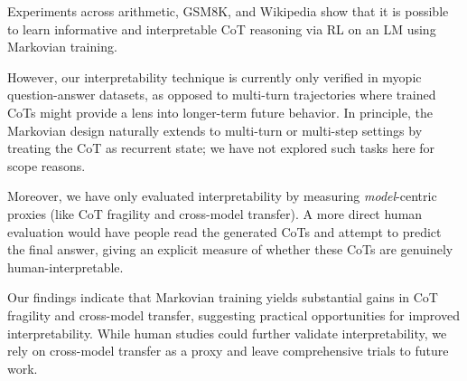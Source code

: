 \documentclass[letterpaper]{article} %
\begin{document}
Experiments across arithmetic, GSM8K, and Wikipedia show that it is possible to learn informative and interpretable CoT reasoning via RL on an LM using Markovian training.

However, our interpretability technique is currently only verified in myopic question-answer datasets, as opposed to multi-turn trajectories where trained CoTs might provide a lens into longer-term future behavior. In principle, the Markovian design naturally extends to multi-turn or multi-step settings by treating the CoT as recurrent state; we have not explored such tasks here for scope reasons.

Moreover, we have only evaluated interpretability by measuring \emph{model}-centric proxies (like CoT fragility and cross-model transfer). A more direct human evaluation would have people read the generated CoTs and attempt to predict the final answer, giving an explicit measure of whether these CoTs are genuinely human-interpretable.

Our findings indicate that Markovian training yields substantial gains in CoT fragility and cross-model transfer, suggesting practical opportunities for improved interpretability. While human studies could further validate interpretability, we rely on cross-model transfer as a proxy and leave comprehensive trials to future work.


\end{document}

